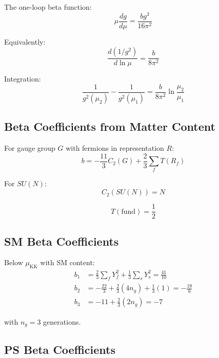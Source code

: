 \documentclass[11pt,a4paper]{article}
\begin{document}
The one-loop beta function:
\begin{equation}
\label{eq:beta-one-loop}
\mu\frac{dg}{d\mu} = \frac{b g^3}{16\pi^2}
\end{equation}

Equivalently:
\begin{equation}
\label{eq:rge-inverse}
\frac{d(1/g^2)}{d\ln\mu} = \frac{b}{8\pi^2}
\end{equation}

Integration:
\begin{equation}
\label{eq:rge-integrated-app}
\frac{1}{g^2(\mu_2)} - \frac{1}{g^2(\mu_1)} = \frac{b}{8\pi^2}\ln\frac{\mu_2}{\mu_1}
\end{equation}

\subsection{Beta Coefficients from Matter Content}
\label{app:beta-matter}

For gauge group $G$ with fermions in representation $R$:
\begin{equation}
\label{eq:b-fermion}
b = -\frac{11}{3}C_2(G) + \frac{2}{3}\sum_f T(R_f)
\end{equation}

For $SU(N)$:
\begin{equation}
\label{eq:c2-sun}
C_2(SU(N)) = N
\end{equation}

\begin{equation}
\label{eq:t-fund}
T(\text{fund}) = \frac{1}{2}
\end{equation}

\subsection{SM Beta Coefficients}
\label{app:sm-beta-app}

Below $\mu_{\text{KK}}$ with SM content:
\begin{align}
\label{eq:b1-sm-app}
b_1 &= \frac{2}{3}\sum_f Y_f^2 + \frac{1}{3}\sum_s Y_s^2 = \frac{41}{10} \\
\label{eq:b2-sm-app}
b_2 &= -\frac{22}{3} + \frac{2}{3}(4 n_g) + \frac{1}{3}(1) = -\frac{19}{6} \\
\label{eq:b3-sm-app}
b_3 &= -11 + \frac{2}{3}(2 n_g) = -7
\end{align}

with $n_g = 3$ generations.

\subsection{PS Beta Coefficients}
\label{app:ps-beta-app}
\end{document}
